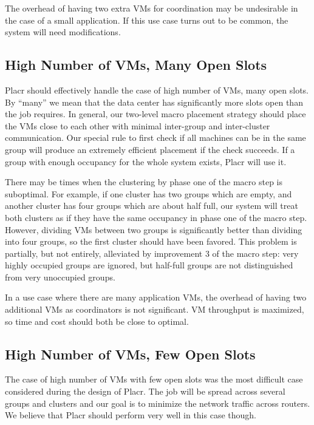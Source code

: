\documentclass[11pt]{article}
\begin{document}
The overhead of having two extra VMs for coordination may be undesirable in the case of a small application.  If this use case turns out to be common, the system will need modifications.

\subsection{High Number of VMs, Many Open Slots}

Placr should effectively handle the case of high number of VMs, many open slots.  By “many” we mean that the data center has significantly more slots open than the job requires. In general, our two-level macro placement strategy should place the VMs close to each other with minimal inter-group and inter-cluster communication.  Our special rule to first check if all machines can be in the same group will produce an extremely efficient placement if the check succeeds.  If a group with enough occupancy for the whole system exists, Placr will use it.

There may be times when the clustering by phase one of the macro step is suboptimal. For example, if one cluster has two groups which are empty, and another cluster has four groups which are about half full, our system will treat both clusters as if they have the same occupancy in phase one of the macro step. However, dividing VMs between two groups is significantly better than dividing into four groups, so the first cluster should have been favored. This problem is partially, but not entirely, alleviated by improvement 3 of the macro step: very highly occupied groups are ignored, but half-full groups are not distinguished from very unoccupied groups.

In a use case where there are many application VMs, the overhead of having two additional VMs as coordinators is not significant.  VM throughput is maximized, so time and cost should both be close to optimal.


\subsection{High Number of VMs, Few Open Slots}

The case of high number of VMs with few open slots was the most difficult case considered during the design of Placr.  The job will be spread across several groups and clusters and our goal is to minimize the network traffic across routers.  We believe that Placr should perform very well in this case though.
\end{document}
